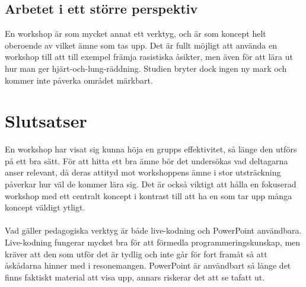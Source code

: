 \subsection{Arbetet i ett större perspektiv}
\label{sec:seba-work-wider-context}
En workshop är som mycket annat ett verktyg, och är
som koncept helt oberoende av vilket ämne som tas upp.
Det är fullt möjligt att använda en workshop till att
till exempel främja rasistiska åsikter, men även för att lära
ut hur man ger hjärt-och-lung-räddning. Studien
bryter dock ingen ny mark och kommer inte påverka
området märkbart.

\section{Slutsatser}
\label{cha:seba-conclusion}
En workshop har visat sig kunna höja en grupps effektivitet, så länge
den utförs på ett bra sätt. För att hitta ett bra ämne bör det 
undersökas vad deltagarna anser relevant, då deras attityd mot
workshoppens ämne i stor utsträckning påverkar hur väl de kommer lära sig.
Det är också viktigt att hålla en fokuserad workshop med ett centralt koncept
i kontrast till att ha en som tar upp många koncept väldigt ytligt.
\\ \\
Vad gäller pedagogiska verktyg är både live-kodning och PowerPoint användbara.
Live-kodning fungerar mycket bra för att förmedla programmeringskunskap, men
kräver att den som utför det är tydlig och inte går för fort framåt så att
åskådarna hinner med i resonemangen. PowerPoint är användbart
så länge det finns faktiskt material att visa upp, annars riskerar
det att se tafatt ut.